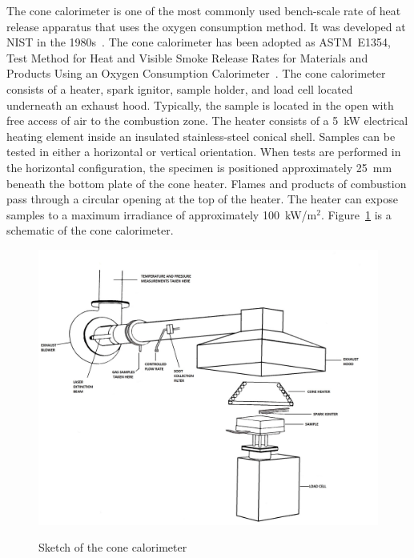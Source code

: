 \documentclass[twoside]{uocthesis}
\begin{document}
The cone calorimeter is one of the most commonly used bench-scale rate of heat release apparatus that uses the oxygen consumption method. It was developed at NIST in the 1980s~\cite{babrauskas:1984}. The cone calorimeter has been adopted as ASTM~E1354, Test Method for Heat and Visible Smoke Release Rates for Materials and Products Using an Oxygen Consumption Calorimeter~\cite{ASTM_E1354}. The cone calorimeter consists of a heater, spark ignitor, sample holder, and load cell located underneath an exhaust hood. Typically, the sample is located in the open with free access of air to the combustion zone. The heater consists of a 5~kW electrical heating element inside an insulated stainless-steel conical shell. Samples can be tested in either a horizontal or vertical orientation. When tests are performed in the horizontal configuration, the specimen is positioned approximately 25~mm beneath the bottom plate of the cone heater. Flames and products of combustion pass through a circular opening at the top of the heater. The heater can expose samples to a maximum irradiance of approximately 100~kW/m$^2$. Figure~\ref{Cone_Cal} is a schematic of the cone calorimeter.

\begin{figure}
	\centering
	\includegraphics[width=\textwidth]{../Figures/Cone_Cal} \\
	\caption[Sketch of the cone calorimeter]{Sketch of the cone calorimeter}
	\label{Cone_Cal}
\end{figure}
\end{document}
